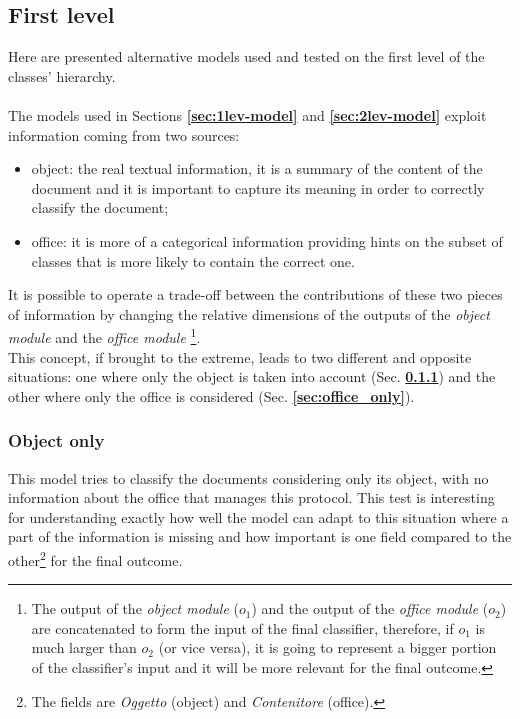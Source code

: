 \documentclass[12pt]{article}
\begin{document}
\subsection{First level}\label{sec:altern_lev1}
Here are presented alternative models used and tested on the first level of the classes' hierarchy.\\\\
The models used in Sections \textbf{\ref{sec:1lev-model}} and \textbf{\ref{sec:2lev-model}} exploit information coming from two sources:
\begin{itemize}
    \item object: the real textual information, it is a summary of the content of the document and it is important to capture its meaning in order to correctly classify the document;
    \item office: it is more of a categorical information providing hints on the subset of classes that is more likely to contain the correct one.
\end{itemize}
It is possible to operate a trade-off between the contributions of these two pieces of information by changing the relative dimensions of the outputs of the \textit{object module} and the \textit{office module}
\footnote{The output of the \textit{object module} ($o_1$) and the output of the \textit{office module} ($o_2$) are concatenated to form the input of the final classifier, therefore, if $o_1$ is much larger than $o_2$ (or vice versa), it is going to represent a bigger portion of the classifier's input and it will be more relevant for the final outcome.}.\\
This concept, if brought to the extreme, leads to two different and opposite situations: one where only the object is taken into account (Sec. \textbf{\ref{sec:obj_only}}) and the other where only the office is considered (Sec. \textbf{\ref{sec:office_only}}).

\subsubsection{Object only}\label{sec:obj_only}
This model tries to classify the documents considering only its object, with no information about the office that manages this protocol. This test is interesting for understanding exactly how well the model can adapt to this situation where a part of the information is missing and how important is one field compared to the other\footnote{The fields are \textit{Oggetto} (object) and \textit{Contenitore} (office).}
for the final outcome.
\end{document}
